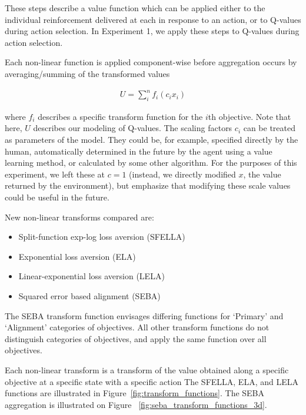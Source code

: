 These steps describe a value function which can be applied either to the individual reinforcement delivered at each in response to an action, or to Q-values during action selection. In Experiment 1, we apply these steps to Q-values during action selection.

Each non-linear function is applied component-wise before aggregation occurs by averaging/summing of the transformed values

\begin{align}
\label{eq:meu}
U=\sum_{i}^n{f_i(c_i x_i)}
\end{align}

\noindent where ${f_i}$ describes a specific transform function for the $i$th objective. Note that here, $U$ describes our modeling of Q-values. The scaling factors $c_i$ can be treated as parameters of the model. They could be, for example, specified directly by the human, automatically determined in the future by the agent using a value learning method, or calculated by some other algorithm. 
For the purposes of this experiment, we left these at $c=1$ (instead, we directly modified $x$, the value returned by the environment), but emphasize that modifying these scale values could be useful in the future.


 New non-linear transforms compared are:

\begin{itemize}
    \item Split-function exp-log loss aversion (SFELLA)
    \item Exponential loss aversion (ELA)
    \item Linear-exponential loss aversion (LELA)
    \item Squared error based alignment (SEBA)
\end{itemize}

\noindent The SEBA transform function envisages differing functions for `Primary' and `Alignment' categories of objectives. All other transform functions do not distinguish categories of objectives, and apply the same function over all objectives.

Each non-linear transform is a transform of the value obtained along a specific objective %
at a specific state %
with a specific action %
The SFELLA, ELA, and LELA functions are illustrated in Figure~\ref{fig:transform_functions}. The SEBA aggregation is illustrated on Figure ~\ref{fig:seba_transform_functions_3d}.

